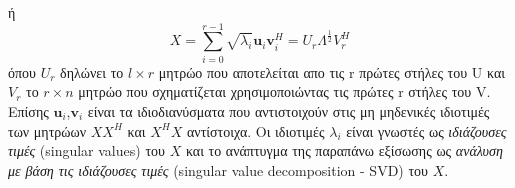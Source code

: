 \hspace*{\fill}\newline
ή
\newline\hspace*{\fill}
\begin{equation}
	X = \sum_{i=0}^{r-1} \sqrt{\lambda_{i}} \mathbf{u}_{i}\mathbf{v}_{i}^{H} = U_{r}\Lambda^{\frac{1}{2}}V_{r}^{H}
\end{equation}
\hspace*{\fill}\newline
όπου $U_{r}$ δηλώνει το $l \times r$ μητρώο που αποτελείται απο τις \textlatin{r} πρώτες στήλες του \textlatin{U} και $V_{r}$ το $r \times n$ μητρώο που σχηματίζεται χρησιμοποιώντας τις πρώτες \textlatin{r} στήλες του \textlatin{V}. Επίσης $ \mathbf{u}_{i} $,$ \mathbf{v}_{i} $ είναι τα ιδιοδιανύσματα που αντιστοιχούν στις μη μηδενικές ιδιοτιμές των μητρώων $XX^{H}$ και $X^{H}X$ αντίστοιχα. Οι ιδιοτιμές $ \lambda_{i} $ είναι γνωστές ως \textit{ιδιάζουσες τιμές} \textlatin{(singular values)} του $X$ και το ανάπτυγμα της παραπάνω εξίσωσης ως \textit{ανάλυση με βάση τις ιδιάζουσες τιμές} \textlatin{(singular value decomposition - SVD)} του $X$.
